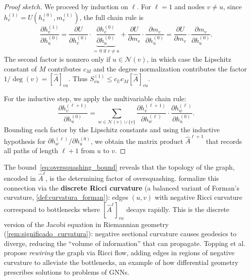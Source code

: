 \begin{proof}[Proof sketch]
	We proceed by induction on $\ell$. For $\ell = 1$ and nodes $v \neq u$,
	since $h_v^{(1)} = U(h_v^{(0)}, m_v^{(1)})$, the full chain rule is
	\[
		\frac{\partial h_v^{(1)}}{\partial h_u^{(0)}}
		= \frac{\partial U}{\partial h_v^{(0)}}
		  \cdot \underbrace{\frac{\partial h_v^{(0)}}{\partial h_u^{(0)}}}_{=\,0 \text{ if } v \neq u}
		+ \frac{\partial U}{\partial m_v}
		  \cdot \frac{\partial m_v}{\partial h_u^{(0)}}
		= \frac{\partial U}{\partial m_v}
		  \cdot \frac{\partial m_v}{\partial h_u^{(0)}}.
	\]
	The second factor is nonzero only if $u \in \mathcal{N}(v)$, in which case
	the Lipschitz constant of $M$ contributes $c_M$ and the degree
	normalization contributes the factor $1/\deg(v) = [\hat{A}]_{vu}$. Thus
	$S_{vu}^{(1)} \leq c_U c_M [\hat{A}]_{vu}$.

	For the inductive step, we apply the multivariable chain rule:
	\[
		\frac{\partial h_v^{(\ell+1)}}{\partial h_u^{(0)}} = \sum_{w \in \mathcal{N}(v) \cup \{v\}} \frac{\partial h_v^{(\ell+1)}}{\partial h_w^{(\ell)}} \cdot \frac{\partial h_w^{(\ell)}}{\partial h_u^{(0)}}.
	\]
	Bounding each factor by the Lipschitz constants and using the inductive hypothesis for $\partial h_w^{(\ell)} / \partial h_u^{(0)}$, we obtain the matrix product $\hat{A}^{\ell+1}$ that records all paths of length $\ell+1$ from $u$ to $v$.
\end{proof}

\begin{remark}\label{rem:curvatura_oversquashing}
	The bound~\eqref{eq:oversquashing_bound} reveals that the topology of the graph, encoded in $\hat{A}^\ell$, is the determining factor of \gls{oversquashing}. \citet{topping2022understanding} formalize this connection via the \textbf{discrete Ricci curvature} (a balanced variant of Forman's curvature, \autoref{def:curvatura_forman}): edges $(u,v)$ with negative Ricci curvature correspond to bottlenecks where $[\hat{A}^\ell]_{vu}$ decays rapidly. This is the discrete version of the Jacobi equation in Riemannian geometry (\autoref{rem:significado_curvatura}): negative sectional curvature causes geodesics to diverge, reducing the ``volume of information'' that can propagate. Topping et al. propose \textit{rewiring} the graph via Ricci flow, adding edges in regions of negative curvature to alleviate the bottlenecks, an example of how differential geometry prescribes solutions to problems of \glspl{GNN}.
\end{remark}

